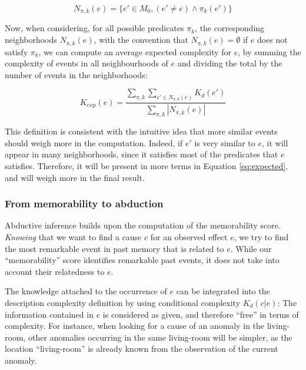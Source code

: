 \documentclass[entropy,article,submit,moreauthors,pdftex]{Definitions/mdpi}
\begin{document}
\begin{equation}
    \label{eq:similar}
    N_{\pi, k}(e) = \{e'\in M_0, (e' \neq e) \wedge \pi_k(e')\}
\end{equation}

Now, when considering, for all possible predicates $\pi_k$, the corresponding
neighborhoods $N_{\pi, k}(e)$, with the convention that $N_{\pi, k}(e) = \emptyset$
if $e$ does not satisfy $\pi_k$, we can compute an average expected complexity for $e$, by summing the complexity of events in all neighbourhoods of $e$ and dividing the total by the number of events in the neighborhoods:

\begin{equation}
    \label{eq:expected}
    K_{exp}(e) = \frac{
    \sum_{\pi, k} \sum_{e' \in N_{\pi, k}(e)} K_d(e')
    }{
    \sum_{\pi, k} |N_{\pi, k}(e)|
    }
\end{equation}

This definition is consistent with the intuitive idea that more similar events should weigh more in the computation. Indeed, if $e'$
is very similar to $e$, it will appear in many neighborhoods, since it
satisfies most of the predicates that $e$ satisfies. Therefore, it will
be present in more terms in Equation \ref{eq:expected}, and will weigh more in
the final result.

\subsubsection{From memorability to abduction}
Abductive inference builds upon the computation
of the memorability score. \emph{Knowing} that we want to find a cause $c$
for an observed effect $e$, we try to find the most remarkable event in past
memory that is related to $e$. While our ``memorability'' score identifies remarkable past events, it does not take into account their relatedness to $e$.

The knowledge attached to the occurrence of $e$ can be integrated into the description complexity definition by using conditional complexity $K_d(c | e)$: The information contained in $e$ is considered as given, and therefore ``free'' in terms of complexity. For instance, when looking for a cause of
an anomaly in the living-room, other anomalies occurring in the same
living-room will be simpler, as the location ``living-room'' is already known
from the observation of the current anomaly.
\end{document}
